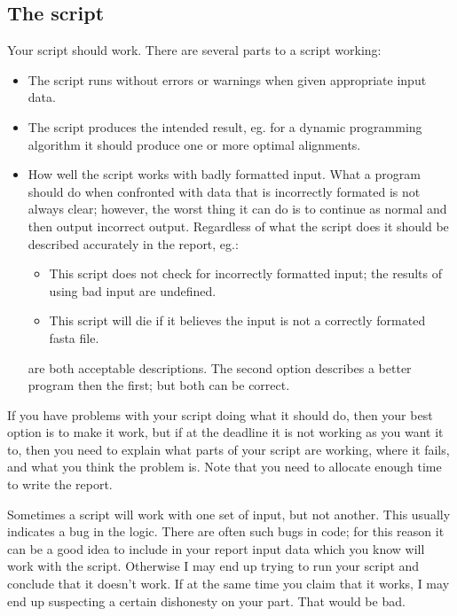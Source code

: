 \documentclass[11pt]{article}
\begin{document}
\subsection{The script}
Your script should work. There are several parts to a script working:
\begin{itemize}
\item The script runs without errors or warnings when given appropriate input
  data.
\item The script produces the intended result, eg. for a dynamic programming
  algorithm it should produce one or more optimal alignments.
\item How well the script works with badly formatted input. What a program
  should do when confronted with data that is incorrectly formated is not
  always clear; however, the worst thing it can do is to continue as normal
  and then output incorrect output. Regardless of what the script does it
  should be described accurately in the report, eg.:
  \begin{itemize}
  \item This script does not check for incorrectly formatted input; the
    results of using bad input are undefined.
  \item This script will die if it believes the input is not a correctly
    formated fasta file.
  \end{itemize}
  are both acceptable descriptions. The second option describes a better
  program then the first; but both can be correct.
\end{itemize}

If you have problems with your script doing what it should do, then your best
option is to make it work, but if at the deadline it is not working as you
want it to, then you need to explain what parts of your script are working, 
where it fails, and what you think the problem is. Note that you
need to allocate enough time to write the report.

Sometimes a script will work with one set of input, but not another. This
usually indicates a bug in the logic. There are often such bugs in code; for
this reason it can be a good idea to include in your report input data which
you know will work with the script. Otherwise I may end up trying to run your
script and conclude that it doesn't work. If at the same time you claim that
it works, I may end up suspecting a certain dishonesty on your part. That
would be bad.
\end{document}

